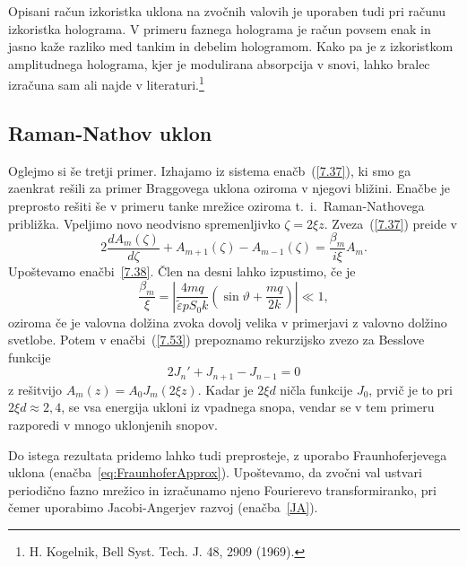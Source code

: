 \begin{remark}
Opisani račun izkoristka uklona na zvočnih valovih je uporaben tudi
pri računu izkoristka holograma. V primeru faznega holograma je račun
povsem enak in jasno kaže razliko med tankim in debelim hologramom.
Kako pa je z izkoristkom amplitudnega holograma, kjer je modulirana
absorpcija v snovi, lahko bralec izračuna sam ali najde v literaturi.\footnote{H.
Kogelnik, Bell Syst. Tech. J. 48, 2909 (1969).}
\end{remark}

\subsection*{Raman-Nathov uklon}
Oglejmo si še tretji primer. Izhajamo iz sistema enačb~(\ref{7.37}), ki smo ga 
zaenkrat rešili za primer Braggovega uklona oziroma v njegovi bližini. 
Enačbe je preprosto rešiti še v primeru tanke mrežice oziroma t.\ i.\ Raman-Nathovega približka. 
Vpeljimo novo neodvisno spremenljivko $\zeta=2\xi z$. 
Zveza~(\ref{7.37})
preide v 
\begin{equation}
2\frac{dA_{m}(\zeta)}{d\zeta}+A_{m+1}(\zeta)-A_{m-1}(\zeta)=\frac{\beta_{m}}{i\xi}A_{m}.
\label{7.53}
\end{equation}
Upoštevamo enačbi~\ref{7.38}. Člen na desni lahko izpustimo, če je 
\begin{equation}
\frac{\beta_{m}}{\xi}=\left| \frac{4mq}{\tilde{\varepsilon}pS_0k}(\sin\vartheta+\frac{mq}{2k})\right| 
\ll 1,
\label{7.54}
\end{equation}
oziroma če je valovna dolžina zvoka dovolj velika v primerjavi z valovno dolžino svetlobe. Potem 
v enačbi~(\ref{7.53}) prepoznamo rekurzijsko zvezo za Besslove funkcije 
\begin{equation}
2J_{n}'+J_{n+1}-J_{n-1}=0
\label{7.55}
\end{equation}
z rešitvijo $A_{m}(z)=A_{0}J_{m}(2\xi z)$. Kadar je $2\xi d$ ničla funkcije
$J_{0}$, prvič je to pri $2\xi d\approx 2,4$, se vsa energija ukloni iz
vpadnega snopa, vendar se v tem primeru 
razporedi v mnogo uklonjenih snopov.
\begin{remark}
Do istega rezultata pridemo lahko tudi preprosteje, z uporabo Fraunhoferjevega uklona
(enačba~\ref{eq:FraunhoferApprox}). Upoštevamo, da zvočni val ustvari periodično fazno 
mrežico in izračunamo njeno Fourierevo transformiranko, pri čemer uporabimo 
Jacobi-Angerjev razvoj (enačba~\ref{JA}). 
\end{remark}

